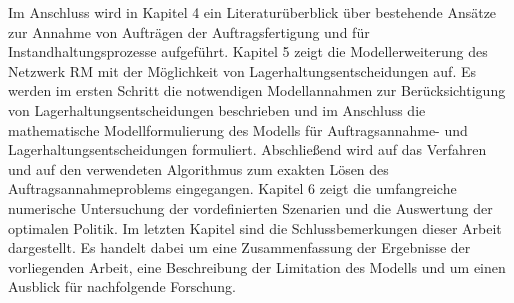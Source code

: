 Im Anschluss wird in Kapitel 4 ein Literaturüberblick über bestehende Ansätze zur Annahme von Aufträgen der Auftragsfertigung und für Instandhaltungsprozesse aufgeführt. Kapitel 5 zeigt die Modellerweiterung des Netzwerk RM mit der Möglichkeit von Lagerhaltungsentscheidungen auf. Es werden im ersten Schritt die notwendigen Modellannahmen zur Berücksichtigung von Lagerhaltungsentscheidungen beschrieben und im Anschluss die mathematische Modellformulierung des Modells für Auftragsannahme- und Lagerhaltungsentscheidungen formuliert. Abschließend wird auf das Verfahren und auf den verwendeten Algorithmus zum exakten Lösen des Auftragsannahmeproblems eingegangen. Kapitel 6 zeigt die umfangreiche numerische Untersuchung der vordefinierten Szenarien und die Auswertung der optimalen Politik. Im letzten Kapitel sind die Schlussbemerkungen dieser Arbeit dargestellt. Es handelt dabei um eine Zusammenfassung der Ergebnisse der vorliegenden Arbeit, eine Beschreibung der Limitation des Modells und um einen Ausblick für nachfolgende Forschung.